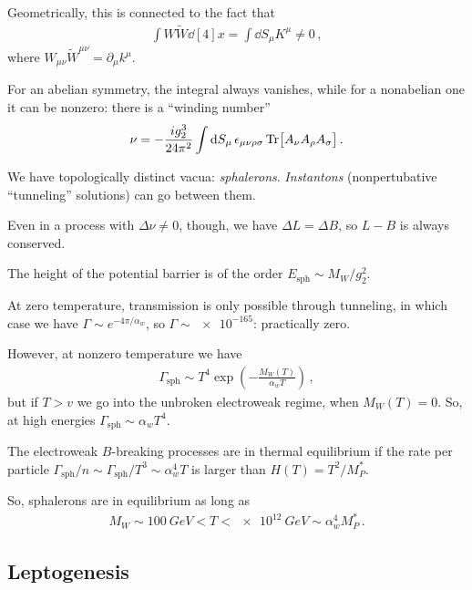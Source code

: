 \documentclass[main.tex]{subfiles}
\begin{document}
Geometrically, this is connected to the fact that 
%
\begin{align}
\int W \widetilde{W} \dd[4]{x} = \int \dd{S_{\mu }} K^{\mu } \neq 0
\,,
\end{align}
%
where \(W_{\mu \nu } \widetilde{W}^{\mu \nu } = \partial_{\mu } k^{\mu }\).

For an abelian symmetry, the integral always vanishes, while for a nonabelian one it can be nonzero: there is a ``winding number'' 
%
\begin{align}
\nu = - \frac{i g_2^3}{24 \pi^2} \int \dd{S_\mu } \epsilon_{\mu \nu \rho \sigma } \Tr[A_{\nu }A_{\rho }A_{\sigma }]
\,.
\end{align}

We have topologically distinct vacua: \emph{sphalerons}. \emph{Instantons} (nonpertubative ``tunneling'' solutions) can go between them. 

Even in a process with \(\Delta \nu \neq 0\), though, we have \(\Delta L = \Delta B\), so \(L-B\) is always conserved. 

The height of the potential barrier is of the order \(E _{\text{sph}} \sim M_W / g_2^2\). 

At zero temperature, transmission is only possible through tunneling, in which case we have \(\Gamma \sim e^{-4 \pi / \alpha_{w}}\), so \(\Gamma \sim \num{e-165}\): practically zero. 

However, at nonzero temperature we have 
%
\begin{align}
\Gamma _{\text{sph}} \sim T^{4} \exp( - \frac{M_W(T)}{\alpha_{w} T})
\,,
\end{align}
%
but if \(T > v\) we go into the unbroken electroweak regime, when \(M_W(T ) = 0\). So, at high energies \(\Gamma _{\text{sph}} \sim \alpha_{w} T^{4}\). 


The electroweak \(B\)-breaking processes are in thermal equilibrium if the rate per particle \(\Gamma _{\text{sph}} / n \sim \Gamma _{\text{sph}} / T^3 \sim \alpha_w^{4} T\) is larger than \(H(T) = T^2 / M_P^{*}\). 


So, sphalerons are in equilibrium as long as 
%
\begin{align}
M_W \sim \SI{100}{GeV} < T < \SI{e12}{GeV} \sim \alpha_w^{4}M_P^{*}
\,.
\end{align}



\subsection{Leptogenesis}
\end{document}
